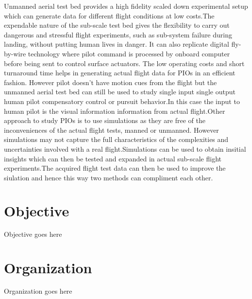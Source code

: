 \par Unmanned aerial test bed provides a high fidelity scaled down experimental setup which can generate data for different flight conditions at low costs.The expendable nature of the sub-scale test bed gives the flexibility to carry out dangerous and stressful flight experiments, such as sub-system failure during landing, without putting human lives in danger. It can also replicate digital fly-by-wire technology where pilot command is processed by onboard computer before being sent to control surface actuators. The low operating costs and short turnaround time helps in generating actual flight data for PIOs in an efficient fashion\cite{mandal2013flight}. However pilot doesn't have motion cues from the flight but the unmanned aerial test bed can still be used to study single input single output human pilot compensatory control or pursuit behavior.In this case the input to human pilot is the visual information information from actual flight.Other approach to study PIOs is to use simulations\cite{McRuerPIO} as they are free of the inconveniences of the actual flight tests, manned or unmanned. However simulations may not capture the full characteristics of the complexities and uncertainties involved with a real flight\cite{mcruer1997aviation}.Simulations can be used to obtain insitial insights which can then be tested and expanded in actual sub-scale flight experiments.The acquired flight test data can then be used to improve the siulation and hence this way two methods can compliment each other.


\section{Objective}

Objective goes here


\section{Organization}
Organization goes here

